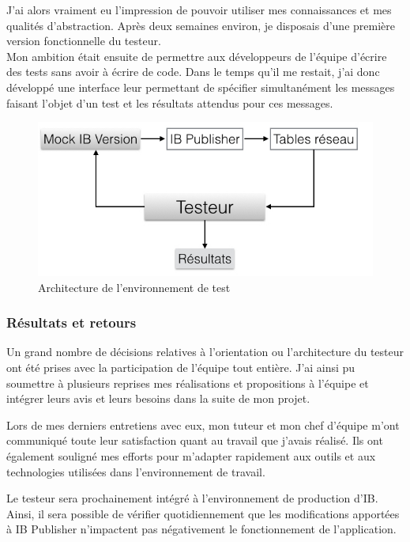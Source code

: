 \documentclass[11pt, oneside, titlepage, a4paper]{article}
\begin{document}
J'ai alors vraiment eu l'impression de pouvoir utiliser mes connaissances et mes qualités d'abstraction. Après deux semaines environ, je disposais d'une première version fonctionnelle du testeur.
\\

Mon ambition était ensuite de permettre aux développeurs de l'équipe d'écrire des tests sans avoir à écrire de code. Dans le temps qu'il me restait, j'ai donc développé une interface leur permettant de spécifier simultanément les messages faisant l'objet d'un test et les résultats attendus pour ces messages.
\begin{figure}
\begin{center}
\includegraphics[scale=0.5]{testeur.jpg}
\caption{Architecture de l'environnement de test}
\end{center}
\end{figure}
		\subsubsection{Résultats et retours}
Un grand nombre de décisions relatives à l'orientation ou l'architecture du testeur ont été prises avec la participation de l'équipe tout entière. J'ai ainsi pu soumettre à plusieurs reprises mes réalisations et propositions à l'équipe et intégrer leurs avis et leurs besoins dans la suite de mon projet.

Lors de mes derniers entretiens avec eux, mon tuteur et mon chef d'équipe m'ont communiqué toute leur satisfaction quant au travail que j'avais réalisé. Ils ont également souligné mes efforts pour m'adapter rapidement aux outils et aux technologies utilisées dans l'environnement de travail.

Le testeur sera prochainement intégré à l'environnement de production d'IB. Ainsi, il sera possible de vérifier quotidiennement que les modifications apportées à IB Publisher n'impactent pas négativement le fonctionnement de l'application.
\\
\end{document}
